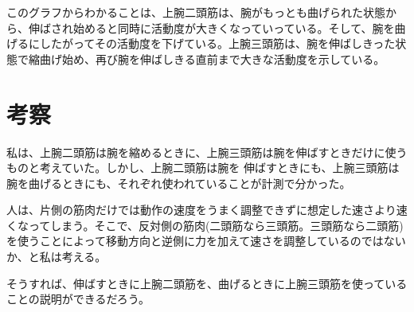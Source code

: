 \documentclass{jsarticle}
\begin{document}
このグラフからわかることは、上腕二頭筋は、腕がもっとも曲げられた状態から、伸ばされ始めると同時に活動度が大きくなっていっている。そして、腕を曲げるにしたがってその活動度を下げている。上腕三頭筋は、腕を伸ばしきった状態で縮曲げ始め、再び腕を伸ばしきる直前まで大きな活動度を示している。
\section{考察}
私は、上腕二頭筋は腕を縮めるときに、上腕三頭筋は腕を伸ばすときだけに使うものと考えていた。しかし、上腕二頭筋は腕を
伸ばすときにも、上腕三頭筋は腕を曲げるときにも、それぞれ使われていることが計測で分かった。

人は、片側の筋肉だけでは動作の速度をうまく調整できずに想定した速さより速くなってしまう。そこで、反対側の筋肉(二頭筋なら三頭筋。三頭筋なら二頭筋)を使うことによって移動方向と逆側に力を加えて速さを調整しているのではないか、と私は考える。

そうすれば、伸ばすときに上腕二頭筋を、曲げるときに上腕三頭筋を使っていることの説明ができるだろう。
\end{document}
